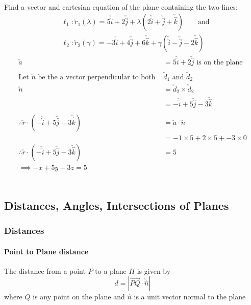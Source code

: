 \documentclass[a4paper,twoside,10pt]{article}
\newenvironment{example}[1]{%
	\mbox{}\\\tcolorbox[beamer,breakable,%
		title=Example: #1,standard jigsaw,opacityback=0, colframe=blue!75!black, boxrule=2pt]}{\endtcolorbox\mbox{}\\}
\begin{document}
			\begin{example}{Equation of Plane Given 2 Intersecting Lines}
				Find a vector and cartesian equation of the plane containing the two lines:
				\begin{align*}
					&\ell_1: \utilde{r}_1(\lambda)=5\utilde{\hat{i}}+2\utilde{\hat{j}}+\lambda\left(2\utilde{\hat{i}}+\utilde{\hat{j}}+\utilde{\hat{k}}\right) \qquad \text{and} \\ &
					\ell_2: \utilde{r}_2(\gamma)=-3\utilde{\hat{i}}+4\utilde{\hat{j}}+6\utilde{\hat{k}}+\gamma\left(\utilde{\hat{i}}-\utilde{\hat{j}}-2\utilde{\hat{k}}\right)
				\end{align*}
				\begin{align*}
					\utilde{a}&=5\utilde{\hat{i}}+2\utilde{\hat{j}}\text{ is on the plane} \\
					\\
					\text{Let $\utilde{n}$ be the a vector perpendicular to both } & \text{$\utilde{d}_1$ and $\utilde{d}_2$} \\
					\utilde{n}&=\utilde{d}_2\times\utilde{d}_2 \\
					&=-\utilde{\hat{i}}+5\utilde{\hat{j}}-3\utilde{\hat{k}} \\
					\\
					\therefore \utilde{r}\cdot\left(-\utilde{\hat{i}}+5\utilde{\hat{j}}-3\utilde{\hat{k}}\right)&=\utilde{a}\cdot\utilde{n}\\
					&=-1\times5+2\times5+-3\times0 \\
					\therefore\utilde{r}\cdot\left(-\utilde{\hat{i}}+5\utilde{\hat{j}}-3\utilde{\hat{k}}\right)&=5 \\
					\implies -x+5y-3z=5
				\end{align*}
			\end{example}
		\subsection{Distances, Angles, Intersections of Planes}
			\subsubsection{Distances}
				\paragraph{Point to Plane distance} The distance from a point $P$ to a plane $\Pi$ is given by
				\[
					d=\left|\overrightarrow{PQ}\cdot\utilde{\hat{n}}\right|
				\]
				where $Q$ is any point on the plane and $\hat{n}$ is a unit vector normal to the plane
				
\end{document}
